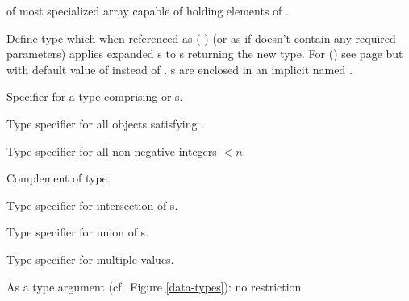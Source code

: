 \begin{LIST}{1cm}
  {
   of most specialized array capable of holding
  elements of . 
  }

  {
  Define type  which when referenced as (
  ) (or as  if 
  doesn't contain any required parameters) applies expanded s to s
  returning the new type. For () see
  page \pageref{section:Macros} but with default value of \kwd{\A}
  instead of \NIL. s are enclosed in an implicit 
  named .
  }

  {
  Specifier for a type comprising  or s.
  }

  {
  Type specifier for all objects satisfying . 
  }

  {
  Type specifier for all non-negative integers $<n$.
  }

  {
  Complement of type.
  }

  {
  Type specifier for intersection of s.
  }

  {
  Type specifier for union of s.
  }

  {
  Type specifier for multiple values.
  }

  \IT{\kwd{\A}}
  {
    As a type argument (cf.\ Figure \ref{data-types}): no restriction.
  }
  \end{LIST}



